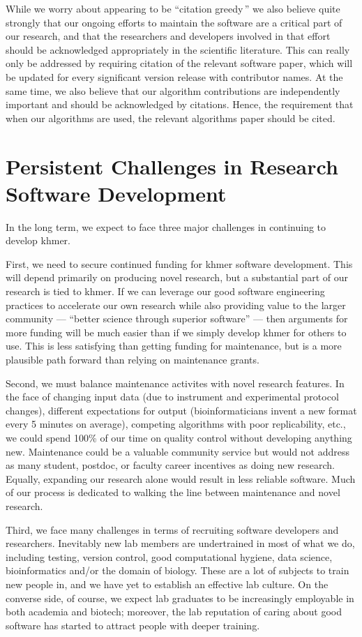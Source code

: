 \documentclass[12pt]{article}
\begin{document}
While we worry about appearing to be ``citation greedy\,'' we also
believe quite strongly that our ongoing efforts to maintain the
software are a critical part of our research, and that the researchers
and developers involved in that effort should be acknowledged
appropriately in the scientific literature.  This can really only be
addressed by requiring citation of the relevant software paper, which
will be updated for every significant version release with contributor
names.  At the same time, we also believe that our algorithm
contributions are independently important and should be acknowledged
by citations.  Hence, the requirement that when our algorithms are
used, the relevant algorithms paper should be cited.

\section{Persistent Challenges in Research Software Development}

In the long term, we expect to face three major challenges in continuing
to develop khmer.

First, we need to secure continued funding for khmer software
development.  This will depend primarily on producing novel research,
but a substantial part of our research is tied to khmer.  If we can
leverage our good software engineering practices to accelerate our own
research while also providing value to the larger community ---
``better science through superior software'' --- then arguments for more
funding will be much easier than if we simply develop khmer for
others to use.  This is less satisfying than getting funding for maintenance,
but is a more plausible path forward than relying on maintenance grants.

Second, we must balance maintenance activites with novel research
features.  In the face of changing input data (due to instrument and
experimental protocol changes), different expectations for output
(bioinformaticians invent a new format every 5 minutes on average),
competing algorithms with poor replicability, etc., we could spend
100\% of our time on quality control without developing anything new.
Maintenance could be a valuable community service but would not address
as many student, postdoc, or faculty career incentives as doing new
research.  Equally, expanding our research alone would result in less
reliable software.  Much of our process is dedicated to walking the
line between maintenance and novel research.

Third, we face many challenges in terms of recruiting software
developers and researchers.  Inevitably new lab members are
undertrained in most of what we do, including testing, version
control, good computational hygiene, data science, bioinformatics
and/or the domain of biology.  These are a lot of subjects to train
new people in, and we have yet to establish an effective lab culture.
On the converse side, of course, we expect lab graduates to be
increasingly employable in both academia and biotech; moreover, the
lab reputation of caring about good software has started to attract
people with deeper training.
\end{document}
